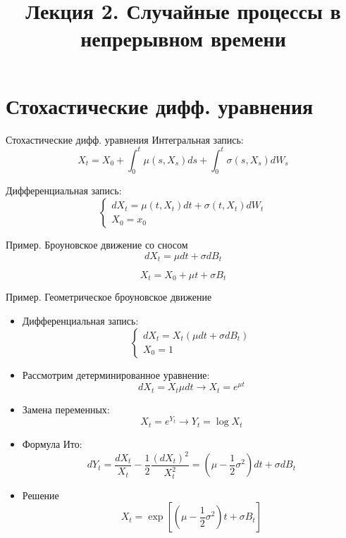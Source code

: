 \documentclass{beamer}
\title[Случайные процессы]{Лекция 2. Случайные процессы в непрерывном времени} %
\begin{document}
\begin{frame}
\titlepage 
\end{frame}

\section{Стохастические дифф. уравнения}
\begin{frame}{Стохастические дифф. уравнения}
    Интегральная запись:
    $$
        X_t = X_0 + \int_0^t \mu(s, X_s) ds + \int_0^t \sigma(s, X_s) dW_s
    $$

    Дифференциальная запись:
    $$
    \begin{cases}
        d X_t = \mu(t, X_t) dt + \sigma(t, X_t) dW_t \\
        X_0 = x_0
    \end{cases}
    $$
\end{frame}

\begin{frame}{Пример. Броуновское движение со сносом}
    $$
        dX_t = \mu dt + \sigma dB_t 
    $$
     
    $$
        X_t = X_0 + \mu t + \sigma B_t
    $$
\end{frame}

\begin{frame}{Пример. Геометрическое броуновское движение}
  \begin{itemize}
      \item     Дифференциальная запись:
    $$\begin{cases}
            dX_t = X_t \left( \mu dt + \sigma dB_t \right) \\
            X_0 = 1
    \end{cases}$$
    \item   Рассмотрим детерминированное уравнение:
    $$
        dX_t = X_t \mu dt \to X_t = e^{\mu t}
    $$
    \item Замена переменных:
    $$X_t = e^{Y_t} \longrightarrow  Y_t = \log X_t$$
    \item Формула Ито:
    $$d Y_t = \dfrac{d X_t}{X_t} - \dfrac{1}{2} \dfrac{(dX_t)^2}{X_t^2} =\left( \mu - \dfrac{1}{2}\sigma^2 \right) dt + \sigma dB_t$$
    \item Решение
    $$X_t = \exp\left[ \left( \mu - \dfrac{1}{2}\sigma^2 \right) t + \sigma B_t \right]$$
  \end{itemize}
\end{frame}
\end{document}
